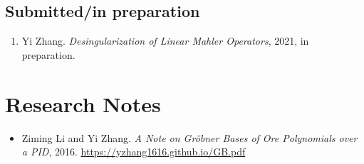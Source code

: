 \documentclass[a4paper,12pt]{article}
\begin{document}
\subsection*{Submitted/in preparation}
\begin{enumerate}
\item Yi Zhang. 
{\em Desingularization of Linear Mahler Operators}, 2021, in preparation.
\end{enumerate}

\section*{\Large{Research Notes}}
\begin{itemize}
 \item Ziming Li and Yi Zhang. {\em A Note on Gr\"{o}bner Bases of Ore Polynomials over a PID}, 2016. 
 \url{https://yzhang1616.github.io/GB.pdf} 
\end{itemize}
\end{document}

